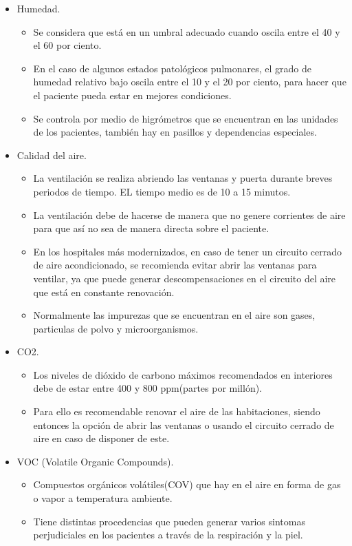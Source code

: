 \documentclass[a4paper]{article}
\begin{document}
\begin{itemize}
	\item Humedad.
		\begin{itemize}
			\item Se considera que está en un umbral adecuado cuando oscila entre el 40 y el 60 por ciento.
			\item En el caso de algunos estados patológicos pulmonares, el grado de humedad relativo bajo oscila entre el 10 y el 20 por ciento, para hacer que el paciente pueda estar en mejores condiciones.
			\item Se controla por medio de higrómetros que se encuentran en las unidades de los pacientes, también hay en pasillos y dependencias especiales.
		\end{itemize}
	\item Calidad del aire.
		\begin{itemize}
			\item La ventilación se realiza abriendo las ventanas y puerta durante breves periodos de tiempo. EL tiempo medio es de 10 a 15 minutos.
			\item La ventilación debe de hacerse de manera que no genere corrientes de aire para que así no sea de manera directa sobre el paciente.
			\item En los hospitales más modernizados, en caso de tener un circuito cerrado de aire acondicionado, se recomienda evitar abrir las ventanas para ventilar, ya que puede generar descompensaciones en el circuito del aire que está en constante renovación.
			\item Normalmente las impurezas que se encuentran en el aire son gases, particulas de polvo y microorganismos.
		\end{itemize}
	\item CO2.
		\begin{itemize}
			\item Los niveles de dióxido de carbono máximos recomendados en interiores debe de estar entre 400 y 800 ppm(partes por millón). 
			\item Para ello es recomendable renovar el aire de las habitaciones, siendo entonces la opción de abrir las ventanas o usando el circuito cerrado de aire en caso de disponer de este.
		\end{itemize}
	\item VOC (Volatile Organic Compounds).
		\begin{itemize}
			\item Compuestos orgánicos volátiles(COV) que hay en el aire en forma de gas o vapor a temperatura ambiente.
			\item Tiene distintas procedencias que pueden generar varios sintomas perjudiciales en los pacientes a través de la respiración y la piel.

\end{itemize}
\end{itemize}
\end{document}
